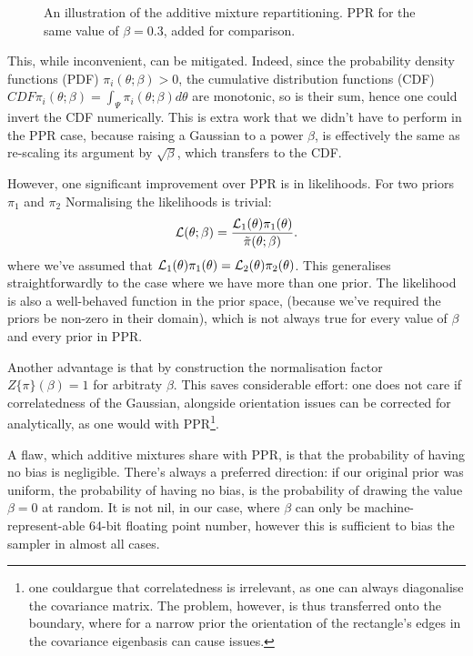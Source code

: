 \documentclass[usenatbib]{mnras}
\begin{document}
\begin{figure}
  
\caption{\label{org0ec6823}
An illustration of the additive mixture repartitioning. PPR for the same value of \(\beta=0.3\), added for comparison.}
\end{figure}

This, while inconvenient, can be mitigated. Indeed, since the
probability density functions (PDF) \(\pi_{i}(\theta; \beta) >0\),
the cumulative distribution functions (CDF)
\(CDF{\pi}_{i}(\theta;\beta) = \int_{\Psi} \pi_{i}(\theta; \beta)
	d\theta\) are monotonic, so is their sum, hence one could invert
the CDF numerically. This is extra work that we didn't have to
perform in the PPR case, because raising a Gaussian to a power
\(\beta\), is effectively the same as re-scaling its argument by
\(\sqrt{\beta}\), which transfers to the CDF.

However, one significant improvement over PPR is in
likelihoods. For two priors \(\pi_{1}\) and \(\pi_{2}\)
Normalising the likelihoods is trivial:
\begin{equation}
{\cal L}(\theta; \beta) = \frac{{\cal L}_{1}(\theta) \pi_{1}(\theta)}{\tilde{\pi}(\theta; \beta)}.
\end{equation}
where we've assumed that \({\cal L}_{1}(\theta)\pi_{1}(\theta)
	= {\cal L}_{2}(\theta) \pi_{2}(\theta)\). This generalises
straightforwardly to the case where we have more than one
prior. The likelihood is also a well-behaved function
in the prior space, (because we've required the priors be
non-zero in their domain), which is not always true for every
value of \(\beta\) and every prior in PPR.

Another advantage is that by construction the normalisation
factor \(Z \{ \pi\}(\beta) = 1\) for arbitraty \(\beta\). This
saves considerable effort: one does not care if correlatedness
of the Gaussian, alongside orientation issues can be corrected
for analytically, as one would with PPR\footnote{one couldargue
that correlatedness is irrelevant, as one can always
diagonalise the covariance matrix. The problem, however, is
thus transferred onto the boundary, where for a narrow prior
the orientation of the rectangle's edges in the covariance
eigenbasis can cause issues.}.

A flaw, which additive mixtures share with PPR, is that the
probability of having no bias is negligible. There's always a
preferred direction: if our original prior was uniform, the
probability of having no bias, is the probability of drawing the
value \(\beta=0\) at random. It is not nil, in our case, where
\(\beta\) can only be machine-represent-able 64-bit floating point
number, however this is sufficient to bias the sampler in almost
all cases.
\end{document}
